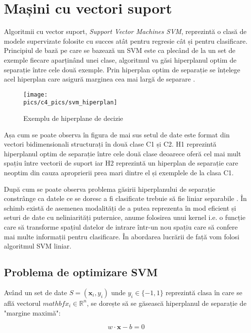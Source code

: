 \section{Mașini cu vectori suport}
Algoritmii cu vector suport, \textit{Support Vector Machines SVM}, reprezintă o clasă de modele supervizate folosite cu succes atât pentru regresie cât și pentru clasificare. Principiul de bază pe care se bazează un SVM este ca plecând de la un set de exemple fiecare aparținând unei clase, algoritmul va găsi hiperplanul optim de separație între cele două exemple. Prin hiperplan optim de separație se înțelege acel hiperplan care asigură marginea cea mai largă de separare \cite{svmbook}.

\begin{figure}[H]
\centering
\texttt{[image: \\pics/c4\_pics/svm\_hiperplan]}
\caption{Exemplu de hiperplane de decizie}
\label{fig:svm_hiper}
\end{figure}

Așa cum se poate observa în figura de mai sus setul de date este format din vectori bidimensionali structurați în două clase C1 și C2. H1 reprezintă hiperplanul optim de separație între cele două clase deoarece oferă cel mai mult spațiu între vectorii de suport iar H2 reprezintă un hiperplan de separație care neoptim din cauza aproprierii prea mari dintre el și exemplele de la clasa C1.

După cum se poate observa problema găsirii hiperplanului de separație constrânge ca datele ce se doresc a fi clasificate trebuie să fie liniar separabile \cite{svmbook}. În schimb există de asemenea modalități de a putea reprezenta în mod eficient și seturi de date cu neliniarități puternice, anume folosirea unui kernel i.e. o funcție care să transforme spațiul datelor de intrare într-un nou spațiu care să confere mai multe informații pentru clasificare. În abordarea lucrării de față vom folosi algoritmul SVM liniar.

\subsection{Problema de optimizare SVM}

Având un set de date $S={(\mathbf{x}_i, y_i)}$ unde $y_i \in \{-1, 1\}$ reprezintă clasa în care se află vectorul $mathbf{x}_i \in \mathbb{R}^n$, se dorește să se găsească hiperplanul de separație de 
"margine maximă":

\begin{equation}
    w \cdot \mathbf{x} - b = 0
\label{eq:svm_eq}
\end{equation}

